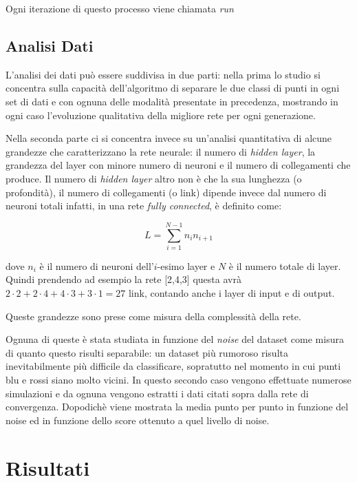 \documentclass[12pt,a4paper]{report}
\begin{document}
Ogni iterazione di questo processo viene chiamata \textit{run}

\section{Analisi Dati}

L'analisi dei dati può essere suddivisa in due parti: nella prima lo studio si concentra sulla capacità dell'algoritmo di separare le due classi di punti in ogni set di dati e con ognuna delle modalità presentate in precedenza, mostrando in ogni caso l'evoluzione qualitativa della migliore rete per ogni generazione.

Nella seconda parte ci si concentra invece su un'analisi quantitativa di alcune grandezze che caratterizzano la rete neurale: il numero di \textit{hidden layer}, la grandezza del layer con minore numero di neuroni e il numero di collegamenti che produce.
Il numero di \textit{hidden layer} altro non è che la sua lunghezza (o profondità), il numero di collegamenti (o link) dipende invece dal numero di neuroni totali infatti, in una rete \textit{fully connected}, è definito come:

\begin{equation}
 L = \sum_{i = 1}^{N-1} n_{i}n_{i+1}
\end{equation}

dove $n_{i}$ è il numero di neuroni dell'$i$-esimo layer e $N$ è il numero totale di layer.
Quindi prendendo ad esempio la rete [2,4,3] questa avrà $2\cdot2 + 2\cdot4 + 4\cdot3 + 3\cdot1 = 27$ link, contando anche i layer di input e di output.

Queste grandezze sono prese come misura della complessità della rete.

Ognuna di queste è stata studiata in funzione del \textit{noise} del dataset come misura di quanto questo risulti separabile: un dataset più rumoroso risulta inevitabilmente più difficile da classificare, sopratutto nel momento in cui punti blu e rossi siano molto vicini.
In questo secondo caso vengono effettuate numerose simulazioni e da ognuna vengono estratti i dati citati sopra dalla rete di convergenza.
Dopodichè viene mostrata la media punto per punto in funzione del noise ed in funzione dello score ottenuto a quel livello di noise.

\chapter{Risultati}
\end{document}
